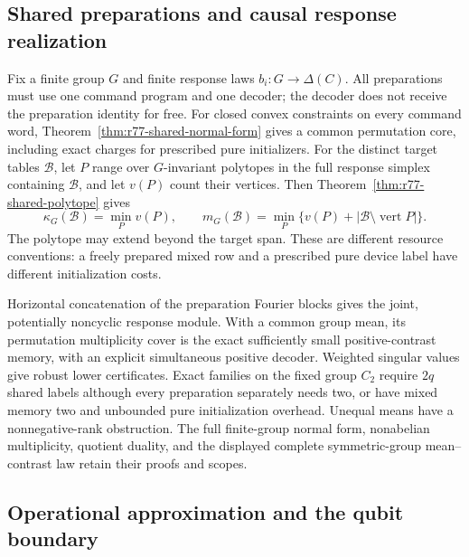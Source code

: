 \subsection*{Shared preparations and causal response realization}

Fix a finite group $G$ and finite response laws $b_i:G\to\Delta(C)$.
All preparations must use one command program and one decoder; the
decoder does not receive the preparation identity for free.  For
closed convex constraints on every command word,
Theorem~\ref{thm:r77-shared-normal-form} gives a common permutation
core, including exact charges for prescribed pure initializers.
For the distinct target tables $\mathcal B$, let $P$ range over
$G$-invariant polytopes in the full response simplex containing
$\mathcal B$, and let $v(P)$ count their vertices.  Then
Theorem~\ref{thm:r77-shared-polytope} gives
\begin{equation}\label{eq:r77-intro-polytope}
 \kappa_G(\mathcal B)=\min_P v(P),\qquad
 m_G(\mathcal B)=\min_P\{v(P)+|\mathcal B\setminus\operatorname{vert}P|\}.
\end{equation}
The polytope may extend beyond the target span.  These are different
resource conventions: a freely prepared mixed row and a prescribed
pure device label have different initialization costs.

Horizontal concatenation of the preparation Fourier blocks gives the
joint, potentially noncyclic response module.  With a common group
mean, its permutation multiplicity cover is the exact sufficiently
small positive-contrast memory, with an explicit simultaneous positive
decoder.  Weighted singular values give robust lower certificates.
Exact families on the fixed group $C_2$ require $2q$ shared labels
although every preparation separately needs two, or have mixed memory
two and unbounded pure initialization overhead.  Unequal means have
a nonnegative-rank obstruction.  The full finite-group normal form,
nonabelian multiplicity, quotient duality, and the displayed complete
symmetric-group mean--contrast law retain their proofs and scopes.

\subsection*{Operational approximation and the qubit boundary}

